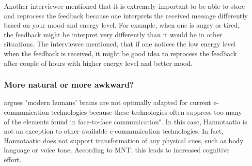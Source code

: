 \documentclass[english,12pt,a4paper,pdftex]{article}
\newcommand{\q}[2]{
\begin{quote}
\emph{(IV #1): #2}
\end{quote}}
\begin{document}
Another interviewee mentioned that it is extremely important to be able to store and reprocess the feedback because one interprets the received message differently based on your mood and energy level. For example, when one is angry or tired, the feedback might be interpret very differently than it would be in other situations. The interviewee mentioned, that if one notices the low energy level when the feedback is received, it might be good idea to reprocess the feedback after couple of hours with higher energy level and better mood.

\subsubsection{More natural or more awkward?}

\citet{kock2005} argues "modern humans' brains are not optimally adapted for current e-communication technologies because these technologies often suppress too many of the elements found in face-to-face communication". In this case, Hannotaatio is not an exception to other available e-communication technologies. In fact, Hannotaatio does not support transformation of any physical cues, such as body language or voice tone. According to \ac{MNT}, this leads to increased cognitive effort.
\end{document}

